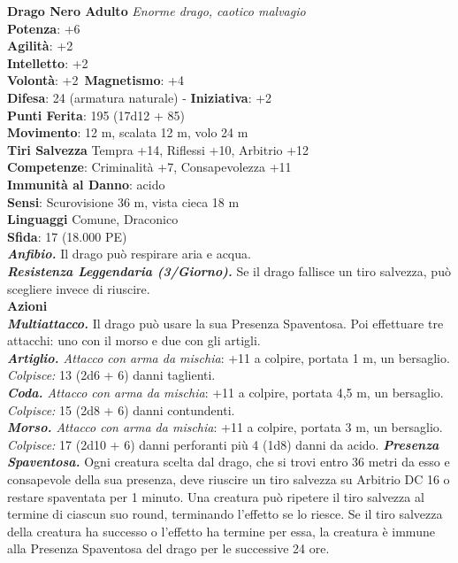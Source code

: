 \begin{multicols}{2}
\medskip\textbf{Drago Nero Adulto}
\emph{Enorme drago, caotico malvagio}\\
\textbf{Potenza}: +6\\
\textbf{Agilità}: +2\\
\textbf{Intelletto}: +2\\
\textbf{Volontà}: +2\
\textbf{Magnetismo}: +4\\
\textbf{Difesa}: 24 (armatura naturale) - \textbf{Iniziativa}: +2\\
\textbf{Punti Ferita}: 195 (17d12 + 85)\\
\textbf{Movimento}: 12 m, scalata 12 m, volo 24 m\\
\textbf{Tiri Salvezza} Tempra +14, Riflessi +10, Arbitrio +12\\
\textbf{Competenze}: Criminalità +7, Consapevolezza +11\\
\textbf{Immunità al Danno}: acido\\
\textbf{Sensi}: Scurovisione 36 m, vista cieca 18 m\\
\textbf{Linguaggi} Comune, Draconico\\
\textbf{Sfida}: 17 (18.000 PE)\smallskip\\
\emph{\textbf{Anfibio.}} Il drago può respirare aria e acqua.\\
\emph{\textbf{Resistenza Leggendaria (3/Giorno).}} Se il drago fallisce un tiro salvezza, può scegliere invece di riuscire.\\
\smallskip\textbf{Azioni}\\
\emph{\textbf{Multiattacco.}} Il drago può usare la sua Presenza Spaventosa. Poi effettuare tre attacchi: uno con il morso e due con gli artigli.\\
\emph{\textbf{Artiglio.} Attacco con arma da mischia}: +11 a colpire, portata 1 m, un bersaglio.\\
\emph{Colpisce:} 13 (2d6 + 6) danni taglienti.\\
\emph{\textbf{Coda.} Attacco con arma da mischia}: +11 a colpire, portata 4,5 m, un bersaglio.\\
\emph{Colpisce:} 15 (2d8 + 6) danni contundenti. \\
\emph{\textbf{Morso.} Attacco con arma da mischia}: +11 a colpire, portata 3 m, un bersaglio.\\
\emph{Colpisce:} 17 (2d10 + 6) danni perforanti più 4 (1d8) danni da acido.
\emph{\textbf{Presenza Spaventosa.}} Ogni creatura scelta dal drago, che si trovi entro 36 metri da esso e consapevole della sua presenza, deve riuscire un tiro salvezza su Arbitrio DC 16 o restare spaventata per 1 minuto. Una creatura può ripetere il tiro salvezza al termine di ciascun suo round, terminando l'effetto se lo riesce. Se il tiro salvezza della creatura ha successo o l'effetto ha termine per essa, la creatura è immune alla Presenza Spaventosa del drago per le successive 24 ore.\\

\end{multicols}
